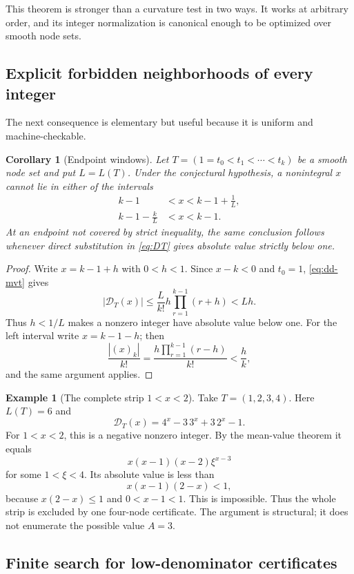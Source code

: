 \documentclass[11pt]{article}
\newtheorem{corollary}[theorem]{Corollary}
\theoremstyle{definition}
\newtheorem{example}[theorem]{Example}
\theoremstyle{remark}
\newcommand{\fall}[2]{(#1)_{#2}}
\begin{document}
This theorem is stronger than a curvature test in two ways. It works at arbitrary order, and its integer normalization is canonical enough to be optimized over smooth node sets.

\subsection{Explicit forbidden neighborhoods of every integer}

The next consequence is elementary but useful because it is uniform and machine-checkable.

\begin{corollary}[Endpoint windows]\label{cor:endpoint-windows}
Let $T=(1=t_0<t_1<\cdots<t_k)$ be a smooth node set and put $L=L(T)$. Under the conjectural hypothesis, a nonintegral $x$ cannot lie in either of the intervals
\begin{align}
  k-1 &<x<k-1+\frac1L,\label{eq:right-window}\\
  k-1-\frac{k}{L}&<x<k-1.\label{eq:left-window}
\end{align}
At an endpoint not covered by strict inequality, the same conclusion follows whenever direct substitution in \eqref{eq:DT} gives absolute value strictly below one.
\end{corollary}

\begin{proof}
Write $x=k-1+h$ with $0<h<1$. Since $x-k<0$ and $t_0=1$, \eqref{eq:dd-mvt} gives
\[
 |\mathscr D_T(x)|\le \frac{L}{k!}
 h\prod_{r=1}^{k-1}(r+h)<Lh.
\]
Thus $h<1/L$ makes a nonzero integer have absolute value below one. For the left interval write $x=k-1-h$; then
\[
 \frac{|\fall{x}{k}|}{k!}
 =\frac{h\prod_{r=1}^{k-1}(r-h)}{k!}<\frac{h}{k},
\]
and the same argument applies.
\end{proof}

\begin{example}[The complete strip $1<x<2$]
Take $T=(1,2,3,4)$. Here $L(T)=6$ and
\[
 \mathscr D_T(x)=4^x-3\,3^x+3\,2^x-1.
\]
For $1<x<2$, this is a negative nonzero integer. By the mean-value theorem it equals
\[
 x(x-1)(x-2)\xi^{x-3}
\]
for some $1<\xi<4$. Its absolute value is less than
\[
 x(x-1)(2-x)<1,
\]
because $x(2-x)\le1$ and $0<x-1<1$. This is impossible. Thus the whole strip is excluded by one four-node certificate. The argument is structural; it does not enumerate the possible value $A=3$.
\end{example}

\subsection{Finite search for low-denominator certificates}
\end{document}
